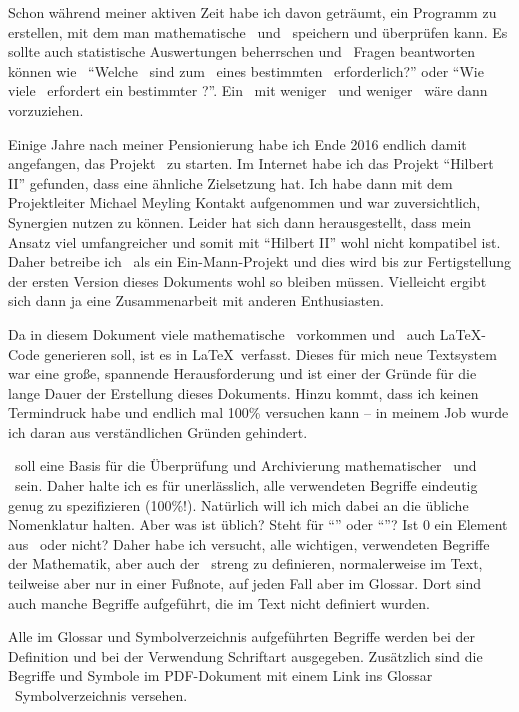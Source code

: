 Schon während meiner aktiven Zeit habe ich davon geträumt, ein Programm zu erstellen, mit dem man mathematische \Saetze\ und \Beweise\ speichern und überprüfen kann.
Es sollte auch statistische Auswertungen beherrschen und \textua\ Fragen beantworten können wie \textzB\
"`Welche \Axiome\ sind zum \Beweis\ eines bestimmten \Satzes\ erforderlich?"' oder
"`Wie viele \Beweisschritte\ erfordert ein bestimmter \Beweis?"'.
Ein \Beweis\ mit weniger \Axiomen\ und weniger \Beweisschritten\ wäre dann vorzuziehen.

Einige Jahre nach meiner Pensionierung habe ich Ende 2016 endlich damit angefangen, das Projekt \ASBA\ zu starten.
Im Internet habe ich das Projekt "`Hilbert II"' \cite{bib:HilbertII} gefunden, dass eine ähnliche Zielsetzung hat.
Ich habe dann mit dem Projektleiter Michael Meyling Kontakt aufgenommen und war zuversichtlich, Synergien nutzen zu können.
Leider hat sich dann herausgestellt, dass mein Ansatz viel umfangreicher und somit mit "`Hilbert II"' wohl nicht kompatibel ist.
Daher betreibe ich \ASBA\ als ein Ein-Mann-Projekt und dies wird bis zur Fertigstellung der ersten Version dieses Dokuments wohl so bleiben müssen.
Vielleicht ergibt sich dann ja eine Zusammenarbeit mit anderen Enthusiasten.

Da in diesem Dokument viele mathematische \Formeln\ vorkommen und \ASBA\ auch \LaTeX-Code generieren soll, ist es in \LaTeX\ verfasst.
Dieses für mich neue Textsystem war eine große, spannende Herausforderung und ist einer der Gründe für die lange Dauer der Erstellung dieses Dokuments.
Hinzu kommt, dass ich keinen Termindruck habe und endlich mal 100\% versuchen kann -- in meinem Job wurde ich daran aus verständlichen Gründen gehindert.

\ASBA\ soll eine Basis für die Überprüfung und Archivierung mathematischer \Saetze\ und \Beweise\ sein.
Daher halte ich es für unerlässlich, alle verwendeten Begriffe eindeutig genug zu spezifizieren (100\%!).
Natürlich will ich mich dabei an die übliche Nomenklatur halten.
Aber was ist üblich?
Steht \chrqt{\MtsSubset} für "`\Teilmenge"' oder "`\echteTeilmenge"'?
Ist $0$ ein Element aus \MtsIN\ oder nicht?
Daher habe ich versucht, alle wichtigen, verwendeten Begriffe der Mathematik, aber auch der \formalenMetasprache\ streng zu definieren, normalerweise im Text, teilweise aber nur in einer Fußnote, auf jeden Fall aber im Glossar.
Dort sind auch manche Begriffe aufgeführt, die im Text nicht definiert wurden.

Alle im Glossar und Symbolverzeichnis aufgeführten Begriffe werden bei der Definition  und bei der Verwendung  Schriftart ausgegeben. Zusätzlich sind die Begriffe und Symbole im PDF-Dokument mit einem Link ins Glossar \textbzw\ Symbolverzeichnis versehen.


